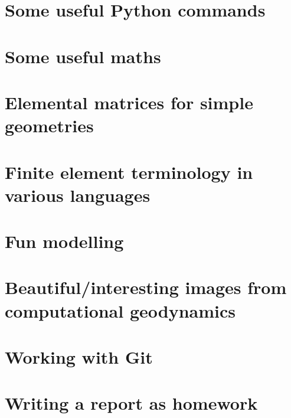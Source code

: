 \documentclass[a4paper]{article}
\numberwithin{equation}{section}
\begin{document}
\section{Some useful Python commands}  %
\newpage %
\section{Some useful maths}  \label{app_maths} %
\newpage %
\section{Elemental matrices for simple geometries}\label{app:mm} 
\newpage %
\section{Finite element terminology in various languages}  %
\newpage %
\section{Fun modelling}  %
\newpage %
\section{Beautiful/interesting images from computational geodynamics}%
\newpage %
\section{Working with Git} %
\newpage %
\section{Writing a report as homework \label{app:grading}} %
\newpage %
\end{document}

